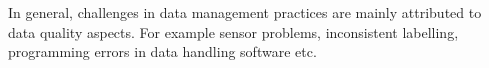 In general, challenges in data management practices are mainly attributed to data quality aspects. For example sensor problems, inconsistent labelling, programming errors in data handling software etc.



